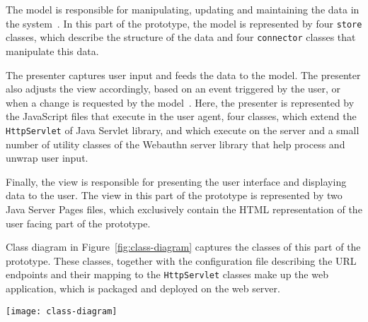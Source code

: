 The model is responsible for manipulating, updating and maintaining the data in the system~\cite{MRizwan2014APresenter}. In this part of the prototype, the model is represented by four \texttt{store} classes, which describe the structure of the data and four \texttt{connector} classes that manipulate this data.

The presenter captures user input and feeds the data to the model. The presenter also adjusts the view accordingly, based on an event triggered by the user, or when a change is requested by the model~\cite{MRizwan2014APresenter}. Here, the presenter is represented by the JavaScript files that execute in the user agent, four classes, which extend the \texttt{HttpServlet} of Java Servlet library, and which execute on the server and a small number of utility classes of the Webauthn server library that help process and unwrap user input.

Finally, the view is responsible for presenting the user interface and displaying data to the user. The view in this part of the prototype is represented by two Java Server Pages files, which exclusively contain the HTML representation of the user facing part of the prototype.

Class diagram in Figure~\ref{fig:class-diagram} captures the classes of this part of the prototype. These classes, together with the configuration file describing the URL endpoints and their mapping to the \texttt{HttpServlet} classes make up the web application, which is packaged and deployed on the web server.

\begin{sidewaysfigure}[p]
    \centering
    \texttt{[image: class-diagram]}
    \caption{Class diagram for the authentication part of the prototype. The red colour represents the view pattern, the green colour represents the presenter and the blue colour represents the model.}
    \label{fig:class-diagram}
\end{sidewaysfigure}
\restoregeometry
    

